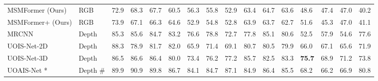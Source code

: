 \documentclass[letterpaper, 10 pt, conference]{ieeeconf}
\begin{document}
\begin{table*}
{\begin{tabular}{|l|l|lllllll|lllllll|}
MSMFormer (Ours)                                             & RGB                    & 72.9                  & 68.3                  & \multicolumn{1}{l|}{67.7} & 60.5                  & 56.3                  & \multicolumn{1}{l|}{55.8} & 52.9          & 63.4                  & 64.7                  & \multicolumn{1}{l|}{63.6} & 48.6                  & 47.4                  & \multicolumn{1}{l|}{47.0} & 40.2          \\
MSMFormer+ (Ours)                                          & RGB                    & 73.9                  & 67.1                  & \multicolumn{1}{l|}{66.3}          & 64.6                  & 52.9                  & \multicolumn{1}{l|}{54.8}          & 52.8          & 63.9                  & 63.7                  & \multicolumn{1}{l|}{62.7}          & 51.6         & 45.3                  & \multicolumn{1}{l|}{47.0} & 41.1          \\ \hline




MRCNN~\cite{he2017mask}    & Depth                  & 85.3                  & 85.6                  & \multicolumn{1}{l|}{84.7}          & 83.2                  & 76.6                  & \multicolumn{1}{l|}{78.8}          & 72.7          & 77.8                  & 85.1                  & \multicolumn{1}{l|}{80.6}          & 52.5                  & 57.9                  & \multicolumn{1}{l|}{54.6}          & 77.6          \\
UOIS-Net-2D \cite{xie2020best}          & Depth                  & 88.3                  & 78.9                  & \multicolumn{1}{l|}{81.7}          & 82.0                  & 65.9                  & \multicolumn{1}{l|}{71.4}          & 69.1          & 80.7                  & 80.5                  & \multicolumn{1}{l|}{79.9}          & 66.0                  & 67.1                  & \multicolumn{1}{l|}{65.6}          & 71.9          \\
UOIS-Net-3D \cite{xie2021unseen}       & Depth                  & 86.5                  & 86.6                  & \multicolumn{1}{l|}{86.4}          & 80.0                  & 73.4                  & \multicolumn{1}{l|}{76.2}          & 77.2          & 85.7                  & 82.5                  & \multicolumn{1}{l|}{83.3}          & \textbf{75.7}         & 68.9                  & \multicolumn{1}{l|}{71.2}          & 73.8          \\

UOAIS-Net \cite{back2022unseen}*   & Depth \#                 & 89.9                           & 90.9                           & \multicolumn{1}{l|}{89.8} & 86.7                           & 84.1                           & \multicolumn{1}{l|}{84.7} & 87.1                           & 84.9                           & 86.4                           & \multicolumn{1}{l|}{85.5} & 68.2                           & 66.2                           & \multicolumn{1}{l|}{66.9} & 80.8                           \\


\end{tabular}}
\end{table*}
\end{document}
